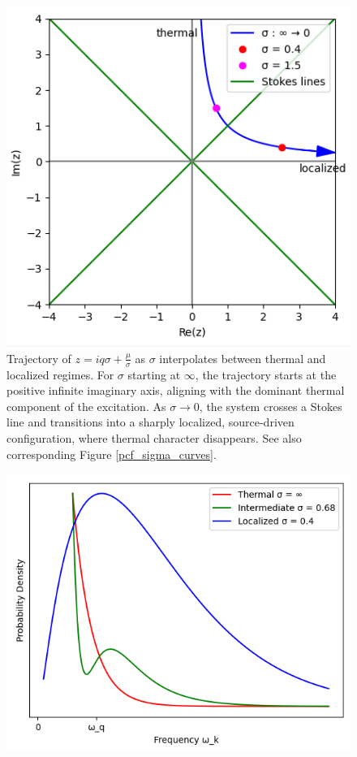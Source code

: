 \documentclass[12pt,a4paper]{article}
\begin{document}
{\begin{figure}[h]
\includegraphics[scale=0.5]{stokes.png}
\caption{Trajectory of $z = i q \sigma + \frac{\mu}{\sigma}$ as $\sigma$ interpolates between thermal and localized regimes. For $\sigma$ starting at $\infty$, the trajectory starts at the positive infinite imaginary axis, aligning with the dominant thermal component of the excitation. As $\sigma \to 0$, the system crosses a Stokes line and transitions into a sharply localized, source-driven configuration, where thermal character disappears. See also corresponding Figure \ref{pcf_sigma_curves}.}
\label{stokes}
\end{figure}
\begin{figure}
\centering
\includegraphics[scale=0.5]{pcf.png}

\end{figure}}
\end{document}
